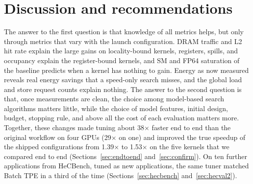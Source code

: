 \documentclass[10pt]{article}
\newcommand{\x}{\ensuremath{\times}}
\begin{document}
\section{Discussion and recommendations}
\label{sec:discussion}

The answer to the first question is that knowledge of all metrics helps, but
only through metrics that vary with the launch configuration. DRAM traffic
and L2 hit rate explain the large gains on locality-bound kernels, registers,
spills, and occupancy explain the register-bound kernels, and SM and FP64
saturation of the baseline predicts when a kernel has nothing to gain.
Energy as now measured reveals real energy savings that a speed-only search
misses, and the global load and store request counts explain nothing. The
answer to the second question is that, once measurements are clean, the
choice among model-based search algorithms matters little, while the choice
of model features, initial design, budget, stopping rule, and above all the
cost of each evaluation matters more. Together, these changes made tuning
about 38\x{} faster end to end than the original workflow on four GPUs (29\x{}
on one) and improved the true speedup of the shipped configurations from
1.39\x{} to 1.53\x{} on the five kernels that we compared end to end
(Sections~\ref{sec:endtoend} and~\ref{sec:confirm}). On ten further
applications from HeCBench, tuned as new applications, the same tuner matched
Batch TPE in a third of the time (Sections~\ref{sec:hecbench} and~\ref{sec:hecval2}).
\end{document}

